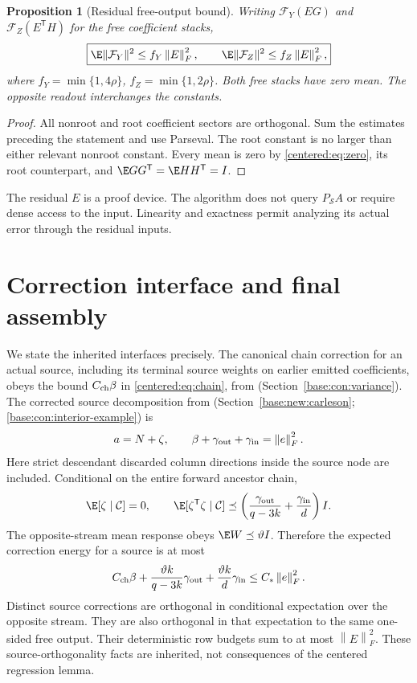 \documentclass[11pt,oneside,openany,a4paper]{book}
\numberwithin{equation}{chapter}
\newtheorem{proposition}[theorem]{Proposition}
\theoremstyle{definition}
\theoremstyle{remark}
\newcommand{\F}[1]{\left\lVert#1\right\rVert_F}
\begin{document}
\begin{proposition}[Residual free-output bound]\label{centered:prop:free}
Writing $\mathcal F_Y(EG)$ and $\mathcal F_Z(E^{\mathsf T}H)$ for the free coefficient stacks,
\begin{equation}\label{centered:eq:free}
 \boxed{\E\|\mathcal F_Y\|^2\le f_Y\F E^2,\qquad
 \E\|\mathcal F_Z\|^2\le f_Z\F E^2,}
\end{equation}
where $f_Y=\min\{1,4\rho\}$, $f_Z=\min\{1,2\rho\}$. Both free stacks have zero mean. The opposite readout interchanges the constants.
\end{proposition}
\begin{proof}
All nonroot and root coefficient sectors are orthogonal. Sum the estimates preceding the statement and use Parseval. The root constant is no larger than either relevant nonroot constant. Every mean is zero by \eqref{centered:eq:zero}, its root counterpart, and $\E GG^{\mathsf T}=\E HH^{\mathsf T}=I$.
\end{proof}

The residual $E$ is a proof device. The algorithm does not query $P_{\mathcal S}A$ or require dense access to the input. Linearity and exactness permit analyzing its actual error through the residual inputs.

\section{Correction interface and final assembly}\label{centered:sec:assemble}
We state the inherited interfaces precisely. The canonical chain correction for an actual source, including its terminal source weights on earlier emitted coefficients, obeys the bound $C_{\rm ch}\beta$ in \eqref{centered:eq:chain}, from (Section~\ref{base:con:variance}). The corrected source decomposition from (Section~\ref{base:new:carleson}; \ref{base:con:interior-example}) is
\[
 a=N+\zeta,\qquad
 \beta+\gamma_{\rm out}+\gamma_{\rm in}=\F e^2.
\]
Here strict descendant discarded column directions inside the source node are included. Conditional on the entire forward ancestor chain,
\[
 \E[\zeta\mid\mathcal C]=0,\qquad
 \E[\zeta^{\mathsf T}\zeta\mid\mathcal C]
 \preceq\left(\frac{\gamma_{\rm out}}{q-3k}
 +\frac{\gamma_{\rm in}}d\right)I.
\]
The opposite-stream mean response obeys $\E W\preceq\vartheta I$. Therefore the expected correction energy for a source is at most
\[
 C_{\rm ch}\beta+\frac{\vartheta k}{q-3k}\gamma_{\rm out}
 +\frac{\vartheta k}{d}\gamma_{\rm in}\le C_*\F e^2.
\]
Distinct source corrections are orthogonal in conditional expectation over the opposite stream. They are also orthogonal in that expectation to the same one-sided free output. Their deterministic row budgets sum to at most $\F E^2$. These source-orthogonality facts are inherited, not consequences of the centered regression lemma.
\end{document}
